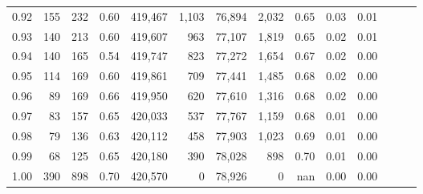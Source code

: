 \begin{tabular}{rrrrrrrrrrrrrr}
0.92 &    155 &    232 &  0.60 &  419,467 &    1,103 &  76,894 &   2,032 &  0.65 &  0.03 &      0.01 \\
0.93 &    140 &    213 &  0.60 &  419,607 &      963 &  77,107 &   1,819 &  0.65 &  0.02 &      0.01 \\
0.94 &    140 &    165 &  0.54 &  419,747 &      823 &  77,272 &   1,654 &  0.67 &  0.02 &      0.00 \\
0.95 &    114 &    169 &  0.60 &  419,861 &      709 &  77,441 &   1,485 &  0.68 &  0.02 &      0.00 \\
0.96 &     89 &    169 &  0.66 &  419,950 &      620 &  77,610 &   1,316 &  0.68 &  0.02 &      0.00 \\
0.97 &     83 &    157 &  0.65 &  420,033 &      537 &  77,767 &   1,159 &  0.68 &  0.01 &      0.00 \\
0.98 &     79 &    136 &  0.63 &  420,112 &      458 &  77,903 &   1,023 &  0.69 &  0.01 &      0.00 \\
0.99 &     68 &    125 &  0.65 &  420,180 &      390 &  78,028 &     898 &  0.70 &  0.01 &      0.00 \\
1.00 &    390 &    898 &  0.70 &  420,570 &        0 &  78,926 &       0 &   nan &  0.00 &      0.00 \\
\bottomrule
\end{tabular}
